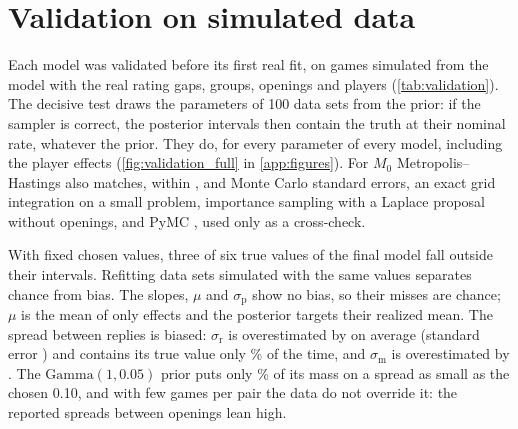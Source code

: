 \documentclass[12pt]{article}
\newcommand{\Gam}{\text{Gamma}}
\newcommand{\sm}{\sigma_{\mathrm{m}}}
\newcommand{\sr}{\sigma_{\mathrm{r}}}
\newcommand{\spl}{\sigma_{\mathrm{p}}}
\begin{document}
\section{Validation on simulated data}\label{sec:validation}

Each model was validated before its first real fit, on games simulated from the model with the real rating gaps, groups, openings and players (\cref{tab:validation}). The decisive test draws the parameters of 100 data sets from the prior: if the sampler is correct, the posterior intervals then contain the truth at their nominal rate, whatever the prior. They do, for every parameter of every model, including the \nPlayers{} player effects (\cref{fig:validation_full} in \cref{app:figures}). For $M_0$ Metropolis--Hastings also matches, within \gridMaxZ, \isMaxZ{} and \pymcMaxZ{} Monte Carlo standard errors, an exact grid integration on a small problem, importance sampling with a Laplace proposal without openings, and PyMC \citep{abrilpla2023pymc}, used only as a cross-check.

\begin{table}[t]
  \centering
  \caption{Validation on simulated games. Second column: shared parameters whose true value lies in its 90\% posterior interval, for one data set simulated with chosen values. Coverage: lowest to highest share, over all parameters and effects, of the posterior intervals that contain the true value, over 100 data sets whose parameters are drawn from the prior.}
  \label{tab:validation}
  \small
  
\end{table}

With fixed chosen values, three of six true values of the final model fall outside their intervals. Refitting \nRepeatsFull{} data sets simulated with the same values separates chance from bias. The slopes, $\mu$ and $\spl$ show no bias, so their misses are chance; $\mu$ is the mean of only \nFirstMoves{} effects and the posterior targets their realized mean. The spread between replies is biased: $\sr$ is overestimated by \biasSigmaReply{} on average (standard error \biasSigmaReplySe) and contains its true value only \insideSigmaReply\% of the time, and $\sm$ is overestimated by \biasSigmaMove. The $\Gam(1, 0.05)$ prior puts only \priorSpreadBelowTenth\% of its mass on a spread as small as the chosen 0.10, and with few games per pair the data do not override it: the reported spreads between openings lean high.
\end{document}
